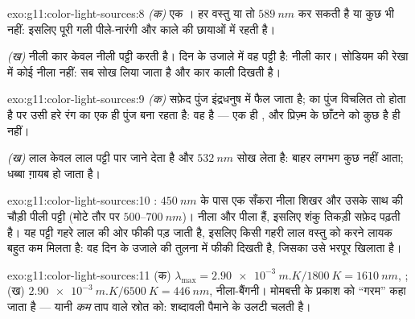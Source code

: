 \begin{solution}{exo:g11:color-light-sources:8}
\emph{(क)} एक । हर वस्तु या तो $\qty{589}{nm}$
 कर सकती है या कुछ भी नहीं: इसलिए पूरी गली पीले-नारंगी और काले की
छायाओं में रहती है।

\emph{(ख)} नीली कार केवल नीली पट्टी  करती है। दिन के उजाले
में वह पट्टी है: नीली कार। सोडियम की रेखा में कोई नीला नहीं: सब सोख लिया
जाता है और कार काली दिखती है।
\end{solution}

\begin{solution}{exo:g11:color-light-sources:9}
\emph{(क)} सफ़ेद पुंज इंद्रधनुष में फैल जाता है;  का पुंज
विचलित तो होता है पर उसी हरे रंग का एक ही पुंज बना रहता है: वह
 है --- एक ही , और प्रिज़्म के छाँटने
को कुछ है ही नहीं।

\emph{(ख)} लाल  केवल लाल पट्टी पार जाने देता है और $\qty{532}{nm}$
सोख लेता है: बाहर लगभग कुछ नहीं आता; धब्बा ग़ायब हो जाता है।
\end{solution}

\begin{solution}{exo:g11:color-light-sources:10}
: $\qty{450}{nm}$ के पास एक सँकरा नीला शिखर और उसके साथ
 की चौड़ी पीली पट्टी (मोटे तौर पर
$500$--$\qty{700}{nm}$)। नीला और पीला  हैं, इसलिए शंकु तिकड़ी सफ़ेद
पढ़ती है। यह पट्टी गहरे लाल की ओर फीकी पड़ जाती है, इसलिए किसी गहरी लाल
वस्तु को  करने लायक बहुत कम मिलता है: वह दिन के उजाले की तुलना में
फीकी दिखती है, जिसका  उसे भरपूर खिलाता है।
\end{solution}

\begin{solution}{exo:g11:color-light-sources:11}
(क) $\lambda_{\max} = \qty{2.90e-3}{m.K}/\qty{1800}{K}
= \qty{1610}{nm}$, ; (ख) $\qty{2.90e-3}{m.K}/\qty{6500}{K} = \qty{446}{nm}$, नीला-बैंगनी। मोमबत्ती के प्रकाश
को ``गरम'' कहा जाता है --- यानी \emph{कम} ताप वाले स्रोत को: शब्दावली
 पैमाने के उलटी चलती है।
\end{solution}

